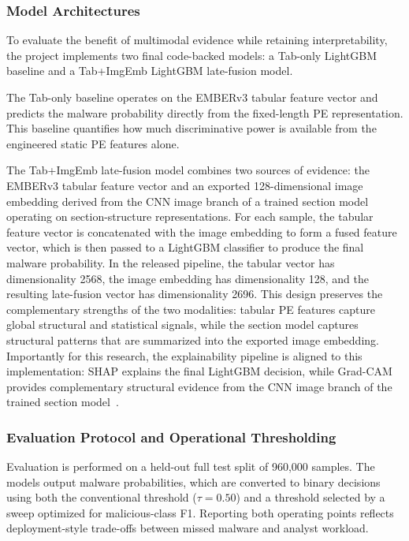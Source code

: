 \documentclass[conference]{IEEEtran}
\begin{document}
\subsubsection{Model Architectures}

To evaluate the benefit of multimodal evidence while retaining interpretability, the project implements two final code-backed models: a Tab-only LightGBM baseline and a Tab+ImgEmb LightGBM late-fusion model.

The Tab-only baseline operates on the EMBERv3 tabular feature vector and predicts the malware probability directly from the fixed-length PE representation.
This baseline quantifies how much discriminative power is available from the engineered static PE features alone.

The Tab+ImgEmb late-fusion model combines two sources of evidence: the EMBERv3 tabular feature vector and an exported 128-dimensional image embedding derived from the CNN image branch of a trained section model operating on section-structure representations.
For each sample, the tabular feature vector is concatenated with the image embedding to form a fused feature vector, which is then passed to a LightGBM classifier to produce the final malware probability.
In the released pipeline, the tabular vector has dimensionality 2568, the image embedding has dimensionality 128, and the resulting late-fusion vector has dimensionality 2696.
This design preserves the complementary strengths of the two modalities: tabular PE features capture global structural and statistical signals, while the section model captures structural patterns that are summarized into the exported image embedding.
Importantly for this research, the explainability pipeline is aligned to this implementation: SHAP explains the final LightGBM decision, while Grad-CAM provides complementary structural evidence from the CNN image branch of the trained section model~\cite{LL2017,SCDVPB2017}.

\subsubsection{Evaluation Protocol and Operational Thresholding}

Evaluation is performed on a held-out full test split of 960,000 samples.
The models output malware probabilities, which are converted to binary decisions using both the conventional threshold ($\tau=0.50$) and a threshold selected by a sweep optimized for malicious-class F1.
Reporting both operating points reflects deployment-style trade-offs between missed malware and analyst workload.
\end{document}
